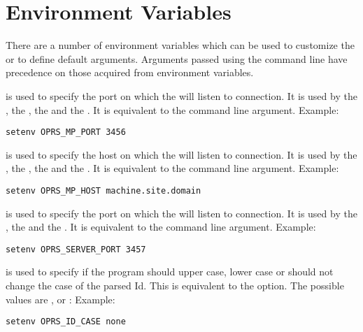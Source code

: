 \section{\OPRSS{} Environment Variables}

There are a number of environment variables which can be used to customize the
\OPRSS{} or to define default arguments. Arguments passed using the command line
have precedence on those acquired from environment variables.

\begin{description}

\item[\code{OPRS\_MP\_PORT}] is used  to specify the port on which the \MPA{} will
listen to connection. It is used by the \CPK{}, the \XPK{}, the \OPRSS{}
and the \MPA{}. It is equivalent to the  command line argument.\*
Example:
\begin{verbatim}
setenv OPRS_MP_PORT 3456
\end{verbatim}

\item[\code{OPRS\_MP\_HOST}] is used  to specify the host on which the \MPA{} will
listen to connection. It is used by the \CPK{}, the \XPK{}, the \MPA{} and the
\OPRSS{}.  It is equivalent to the  command line argument.\*
Example:
\begin{verbatim}
setenv OPRS_MP_HOST machine.site.domain
\end{verbatim}

\item[\code{OPRS\_SERVER\_PORT}] is used  to specify the port on which the
\OPRSS{} will listen to connection. It is used by the \CPK{}, the \XPK{}
and the \OPRSS{}.  It is equivalent to the  command line argument.\*
Example:
\begin{verbatim}
setenv OPRS_SERVER_PORT 3457
\end{verbatim}

\item[\code{OPRS\_ID\_CASE}] is used to specify if the program should upper case,
lower case or should not change the case of the parsed Id. This is equivalent
to the  option. The possible values
are ,  or :\*
Example:
\begin{verbatim}
setenv OPRS_ID_CASE none
\end{verbatim}

\end{description}

